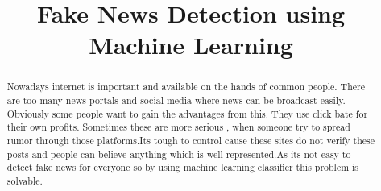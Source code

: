 \documentclass[conference]{IEEEtran}
\begin{document}
\title{Fake News Detection using Machine Learning}



\author{

\and

\and

\and




}

\maketitle

\begin{abstract}

Nowadays internet is important and available on the hands of common people. There are too many news portals and social media where news can be broadcast easily. Obviously some people want to gain the advantages from this. They use click bate for their own profits. Sometimes these are more serious , when someone try to spread rumor through those platforms.Its tough to control cause these sites do not verify these posts and people can believe anything which is well represented.As its not easy to detect fake news for everyone so by using machine learning classifier this problem is solvable.

\end{abstract}
\end{document}
